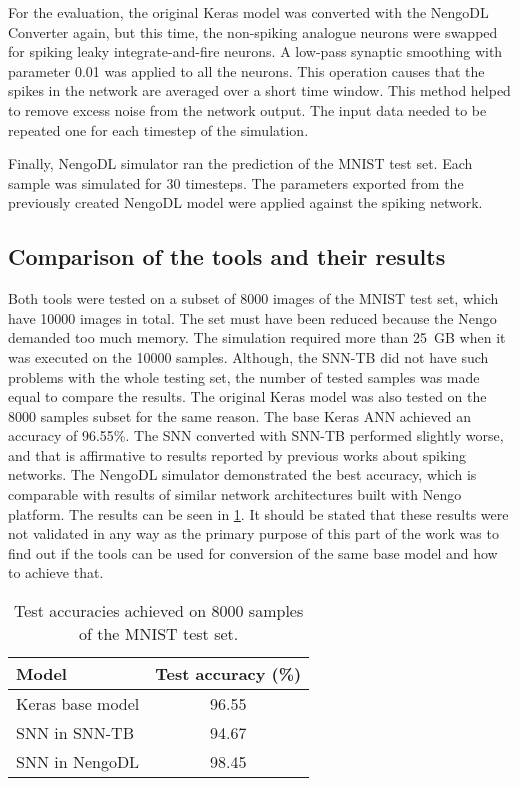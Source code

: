 For the evaluation, the original Keras model was converted with the NengoDL Converter again, but this time, the non-spiking analogue neurons were swapped for spiking leaky integrate-and-fire neurons. A low-pass synaptic smoothing with parameter 0.01 was applied to all the neurons. This operation causes that the spikes in the network are averaged over a short time window. This method helped to remove excess noise from the network output. The input data needed to be repeated one for each timestep of the simulation. \par
Finally, NengoDL simulator ran the prediction of the MNIST test set. Each sample was simulated for 30 timesteps. The parameters exported from the previously created NengoDL model were applied against the spiking network.

\subsection{Comparison of the tools and their results}
Both tools were tested on a subset of 8000 images of the MNIST test set, which have 10000 images in total. The set must have been reduced because the Nengo demanded too much memory. The simulation required more than 25~GB when it was executed on the 10000 samples. Although, the SNN-TB did not have such problems with the whole testing set, the number of tested samples was made equal to compare the results. The original Keras model was also tested on the 8000 samples subset for the same reason. The base Keras ANN achieved an accuracy of 96.55\%. The SNN converted with SNN-TB performed slightly worse, and that is affirmative to results reported by previous works about spiking networks. The NengoDL simulator demonstrated the best accuracy, which is comparable with results of similar network architectures built with Nengo platform. The results can be seen in \cref{tab:MNIST_results}. It should be stated that these results were not validated in any way as the primary purpose of this part of the work was to find out if the tools can be used for conversion of the same base model and how to achieve that.

\begin{table}[htbp]
    \centering
    \begin{tabularx}{\linewidth}{>{\raggedright\arraybackslash}Xc}
    \toprule
        Model & Test accuracy (\%) \\
    \midrule
        Keras base model & 96.55 \\
        SNN in SNN-TB & 94.67 \\
        SNN in NengoDL & 98.45 \\
    \bottomrule
    \end{tabularx}
    \caption{Test accuracies achieved on 8000 samples of the MNIST test set.}
    \label{tab:MNIST_results}
\end{table}

